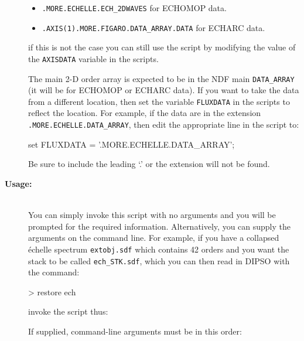 \documentclass[twoside,11pt]{starlink}
\begin{document}
\begin{description}
\begin{itemize}

\item \verb+.MORE.ECHELLE.ECH_2DWAVES+ for ECHOMOP data.

\item \verb+.AXIS(1).MORE.FIGARO.DATA_ARRAY.DATA+ for ECHARC data.

\end{itemize}

     if this is not the case you can still use the script by modifying
     the value of the \verb+AXISDATA+ variable in the scripts.

     The main 2-D order array is expected to be in the NDF main
     \verb+DATA_ARRAY+ (it will be for ECHOMOP or ECHARC data).
     If you want to take the data from a different location, then
     set the variable \verb+FLUXDATA+ in the scripts to reflect
     the location.  For example, if the data are in the extension
     \verb+.MORE.ECHELLE.DATA_ARRAY+, then edit the appropriate line
     in the script to:

\begin{terminalv}
   set FLUXDATA = '.MORE.ECHELLE.DATA_ARRAY';
\end{terminalv}

     Be sure to include the leading `.' or the extension will not be
     found.

\item [\textbf{Usage:}] \mbox{} \\
     You can simply invoke this script with no arguments and you
     will be prompted for the required information.  Alternatively,
     you can supply the arguments on the command line.  For example,
     if you have a collapsed \'{e}chelle spectrum \verb+extobj.sdf+ which
     contains 42 orders and you want the stack to be called
     \texttt{ech\_STK.sdf}, which you can then read in DIPSO with the
     command:

\begin{terminalv}
   > restore ech
\end{terminalv}

     invoke the script thus:

\begin{terminalv}
\end{terminalv}

     If supplied, command-line arguments must be in this order:

\begin{enumerate}


\end{enumerate}
\end{description}
\end{document}
